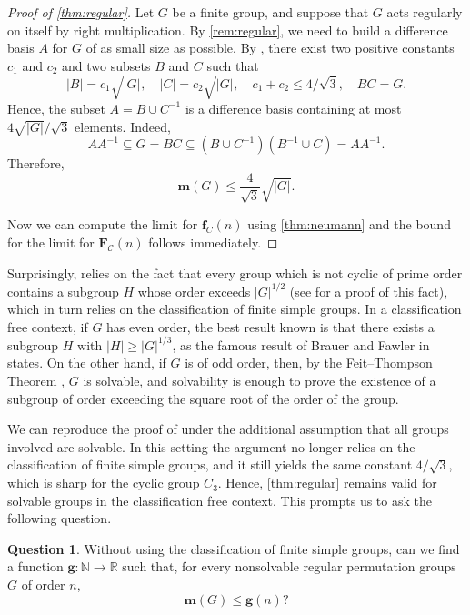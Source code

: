 \documentclass[a4paper]{amsart}
\newcommand{\f}{\mathbf{f}}
\newcommand{\F}{\mathbf{F}}
\newcommand{\m}{\mathbf{m}}
\newcommand{\C}{\mathcal{C}}
\newcommand{\NN}{\mathbb{N}}
\theoremstyle{definition}
\newtheorem{vprasanje}[theorem]{Question}
\begin{document}
\begin{proof}[Proof of \cref{thm:regular}]
    Let $G$ be a finite group, and suppose that $G$ acts regularly on itself by right multiplication. By \cref{rem:regular}, we need to build a difference basis $A$ for $G$ of as small size as possible.
    By \cite[Theorem~1]{KozmaLev1992}, there exist two positive constants $c_1$ and $c_2$ and two subsets $B$ and $C$ such that
    \[|B| = c_1 \sqrt{|G|} , \quad  |C| = c_2 \sqrt{|G|}, \quad c_1 + c_2 \leq 4/\sqrt3, \quad BC = G .\]
    Hence, the subset $A = B \cup C^{-1}$ is a difference basis containing at most $4\sqrt{|G|}/\sqrt3$ elements. Indeed,
    \[AA^{-1} \subseteq G = BC \subseteq (B \cup C^{-1}) (B^{-1} \cup C) = AA^{-1}. \]
    Therefore,
    \[\m(G) \leq  \frac{4}{\sqrt{3}}\sqrt{|G|} .\]
    
    Now we can compute the limit for $\f_C(n)$ using \cref{thm:neumann} and the bound for the limit for $\F_\C(n)$ follows immediately.
\end{proof}

Surprisingly, \cite[Theorem~1]{KozmaLev1992} relies on the fact that every group which is not cyclic of prime order contains a subgroup $H$ whose order exceeds $|G|^{1/2}$ (see \cite{Lev1992} for a proof of this fact), which in turn relies on the classification of finite simple groups. In a classification free context, if $G$ has even order, the best result known is that there exists a subgroup $H$ with $|H|\ge |G|^{1/3}$, as the famous result of Brauer and Fawler in \cite{BrauerFowler1955} states. On the other hand, if $G$ is of odd order, then, by the Feit--Thompson Theorem \cite{FeitThompson1963}, $G$ is solvable, and solvability is enough to prove the existence of a subgroup of order exceeding the square root of the order of the group.

We can reproduce the proof of \cite[Theorem~1]{KozmaLev1992} under the additional assumption that all groups involved are solvable. In this setting the argument no longer relies on the classification of finite simple groups, and it still yields the same constant $4/ \sqrt 3$, which is sharp for the cyclic group $C_3$. Hence, \cref{thm:regular} remains valid for solvable groups in the classification free context. This prompts us to ask the following question.

\begin{vprasanje}
    Without using the classification of finite simple groups, can we find a function $\mathbf{g}: \NN \to \mathbb{R}$ such that, for every nonsolvable regular permutation groups $G$ of order $n$,
    \[ \m(G) \le \mathbf{g}(n) ?\]
\end{vprasanje}
\end{document}
